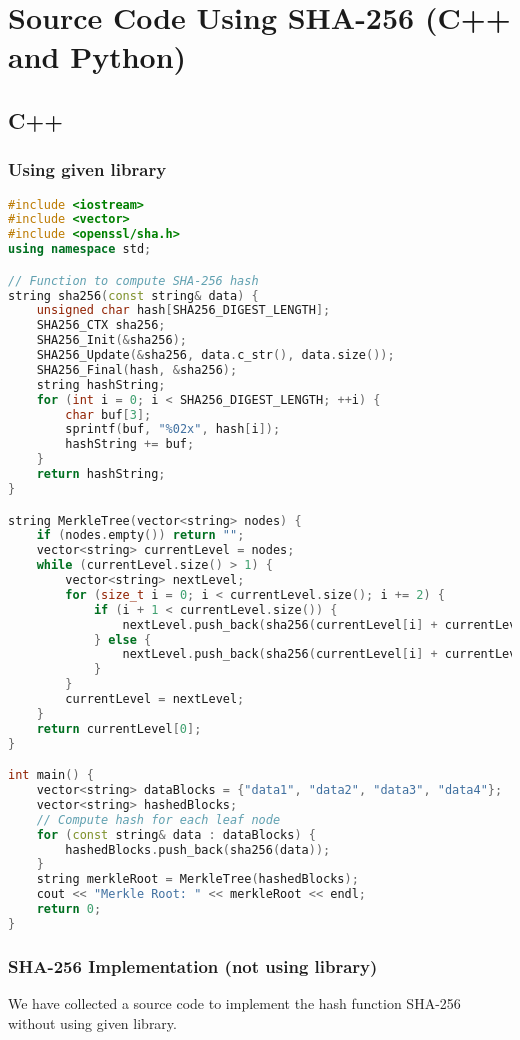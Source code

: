 \section{Source Code Using SHA-256 (C++ and Python)}
\subsection{C++}
\subsubsection{Using given library}
\begin{lstlisting}[language=C++]
#include <iostream>
#include <vector>
#include <openssl/sha.h>
using namespace std;

// Function to compute SHA-256 hash
string sha256(const string& data) {
    unsigned char hash[SHA256_DIGEST_LENGTH];
    SHA256_CTX sha256;
    SHA256_Init(&sha256);
    SHA256_Update(&sha256, data.c_str(), data.size());
    SHA256_Final(hash, &sha256);
    string hashString;
    for (int i = 0; i < SHA256_DIGEST_LENGTH; ++i) {
        char buf[3];
        sprintf(buf, "%02x", hash[i]);
        hashString += buf;
    }
    return hashString;
}

string MerkleTree(vector<string> nodes) {
    if (nodes.empty()) return "";
    vector<string> currentLevel = nodes;
    while (currentLevel.size() > 1) {
        vector<string> nextLevel;
        for (size_t i = 0; i < currentLevel.size(); i += 2) {
            if (i + 1 < currentLevel.size()) {
                nextLevel.push_back(sha256(currentLevel[i] + currentLevel[i + 1]));
            } else {
                nextLevel.push_back(sha256(currentLevel[i] + currentLevel[i])); // Duplicate last node if odd
            }
        }
        currentLevel = nextLevel;
    }
    return currentLevel[0];
}

int main() {
    vector<string> dataBlocks = {"data1", "data2", "data3", "data4"};
    vector<string> hashedBlocks;
    // Compute hash for each leaf node
    for (const string& data : dataBlocks) {
        hashedBlocks.push_back(sha256(data));
    }
    string merkleRoot = MerkleTree(hashedBlocks);
    cout << "Merkle Root: " << merkleRoot << endl;
    return 0;
}


\end{lstlisting}

\subsubsection{SHA-256 Implementation (not using library)}
We have collected a source code to implement the hash function SHA-256 without using given library.

